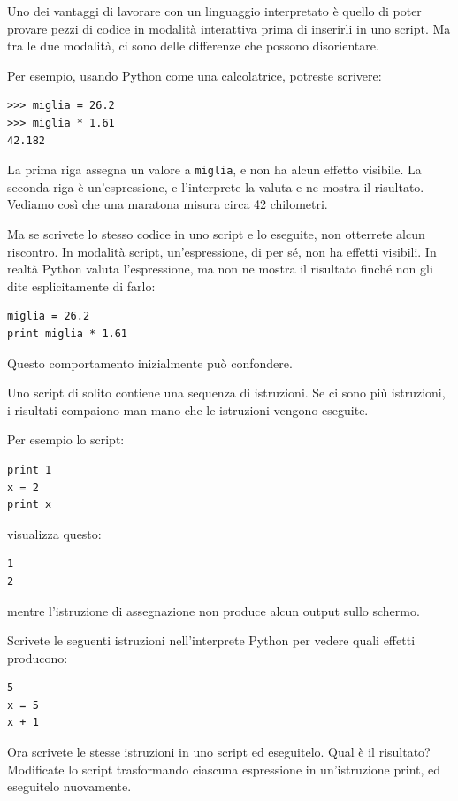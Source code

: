 \documentclass[10pt]{book}
\begin{document}
Uno dei vantaggi di lavorare con un linguaggio interpretato è quello di poter provare pezzi di codice in modalità interattiva prima di inserirli in uno script. Ma tra le due modalità, ci sono delle differenze che possono disorientare.

Per esempio, usando Python come una calcolatrice, potreste scrivere:

\begin{verbatim}
>>> miglia = 26.2
>>> miglia * 1.61
42.182
\end{verbatim}

La prima riga assegna un valore a {\tt miglia}, e non ha alcun effetto visibile. La seconda riga è un'espressione, e l'interprete la valuta e ne mostra il risultato. Vediamo così che una maratona misura circa 42 chilometri.

Ma se scrivete lo stesso codice in uno script e lo eseguite, non otterrete alcun riscontro. In modalità script, un'espressione, di per sé, non ha effetti visibili. In realtà Python valuta l'espressione, ma non ne mostra il risultato finché non gli dite esplicitamente di farlo:

\begin{verbatim}
miglia = 26.2
print miglia * 1.61
\end{verbatim}

Questo comportamento inizialmente può confondere.

Uno script di solito contiene una sequenza di istruzioni. Se ci sono più istruzioni, i risultati compaiono man mano che le istruzioni vengono eseguite.

Per esempio lo script:

\begin{verbatim}
print 1
x = 2
print x
\end{verbatim}
%
visualizza questo:

\begin{verbatim}
1
2
\end{verbatim}
%
mentre l'istruzione di assegnazione non produce alcun output sullo schermo.

\vspace{0.2in}
\begin{exercise}

Scrivete le seguenti istruzioni nell'interprete Python per vedere quali effetti producono:

\begin{verbatim}
5
x = 5
x + 1
\end{verbatim}
%
Ora scrivete le stesse istruzioni in uno script ed eseguitelo. Qual è il risultato? Modificate lo script trasformando ciascuna espressione in un'istruzione print, ed eseguitelo nuovamente.
\end{exercise}
\end{document}
